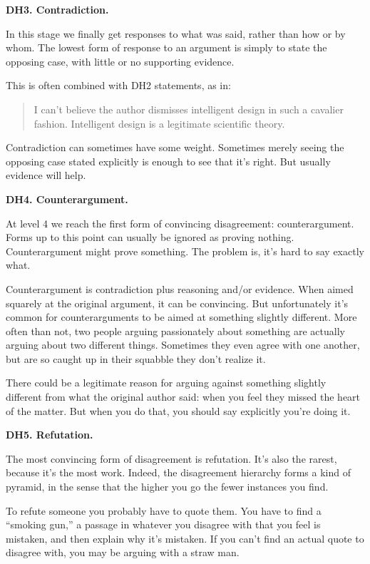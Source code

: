 \documentclass[12pt]{book}
\begin{document}
\textbf{DH3. Contradiction.}

In this stage we finally get responses to what was said, rather than how
or by whom. The lowest form of response to an argument is simply to
state the opposing case, with little or no supporting evidence.

This is often combined with DH2 statements, as in:

\begin{quote}
I can't believe the author dismisses intelligent design in such a
cavalier fashion. Intelligent design is a legitimate scientific theory.
\end{quote}

Contradiction can sometimes have some weight. Sometimes merely seeing
the opposing case stated explicitly is enough to see that it's right.
But usually evidence will help.

\textbf{DH4. Counterargument.}

At level 4 we reach the first form of convincing disagreement:
counterargument. Forms up to this point can usually be ignored as
proving nothing. Counterargument might prove something. The problem is,
it's hard to say exactly what.

Counterargument is contradiction plus reasoning and/or evidence. When
aimed squarely at the original argument, it can be convincing. But
unfortunately it's common for counterarguments to be aimed at something
slightly different. More often than not, two people arguing passionately
about something are actually arguing about two different things.
Sometimes they even agree with one another, but are so caught up in
their squabble they don't realize it.

There could be a legitimate reason for arguing against something
slightly different from what the original author said: when you feel
they missed the heart of the matter. But when you do that, you should
say explicitly you're doing it.

\textbf{DH5. Refutation.}

The most convincing form of disagreement is refutation. It's also the
rarest, because it's the most work. Indeed, the disagreement hierarchy
forms a kind of pyramid, in the sense that the higher you go the fewer
instances you find.

To refute someone you probably have to quote them. You have to find a
``smoking gun,'' a passage in whatever you disagree with that you feel
is mistaken, and then explain why it's mistaken. If you can't find an
actual quote to disagree with, you may be arguing with a straw man.
\end{document}
